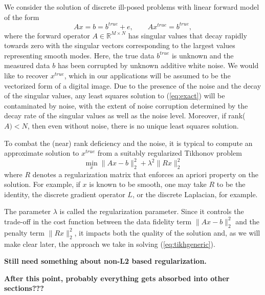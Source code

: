 We consider the solution of discrete ill-posed problems with linear forward model of the form~\cite{Hansenbk}
\begin{equation} \label{eq:exact} A x = b = b^{true} + e,  \qquad Ax^{true} = b^{true},\end{equation} 
where the forward operator $A \in \mathbb{R}^{M \times N}$ has singular values that decay 
rapidly towards zero with the singular vectors corresponding to the largest values representing smooth modes.  Here, the true data $b^{true}$ is unknown and the measured data $b$ has been corrupted by
unknown additive white noise.   We would like to recover $x^{true}$, which in our applications 
will be assumed to be the vectorized form of a digital image.   Due to the presence of the noise and the 
decay of the singular values, any least squares solution to (\ref{eq:exact}) will be contaminated by
noise, with the extent of noise corruption determined by the decay rate of the singular values as well as the noise level.  Moreover, if rank($A)< N$, then even without noise, there is no unique least squares solution.  

To combat the (near) rank deficiency and the noise, it is typical to compute an approximate solution to $x^{true}$ from a suitably regularized Tikhonov \cite{Tikhonov} problem
\begin{equation}   \label{eq:tikhgeneric} \min_{x} \| A x - b \|_2^2 + \lambda^2 \| R x \|_2^2  \end{equation}
where $R$ denotes a regularization matrix that enforces an apriori property on the solution.   For example, if 
$x$ is known to be smooth, one may take $R$ to be the identity, the discrete gradient operator $L$, or the discrete Laplacian, for example.  

The parameter $\lambda$ is called the regularization parameter.  Since it controls the trade-off in the cost function between the data fidelity term $\| A x - b \|_2^2$ and the penalty term $\| R x \|_2^2$, it impacts  
both the quality of the solution and, as we will make clear later, the approach we take in solving (\ref{eq:tikhgeneric}).

{\bf Still need something about non-L2 based regularization.}

{\bf After this point, probably everything gets absorbed into other
sections???}


